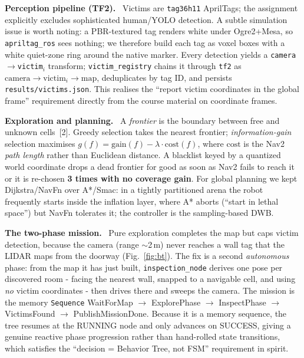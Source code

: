 \documentclass[10pt,twocolumn,a4paper]{article}
\newcommand{\head}[1]{\par\smallskip\noindent\textbf{\color{nccblue}#1}\ \ignorespaces}
\begin{document}
\head{Perception pipeline (TF2).} Victims are \texttt{tag36h11} AprilTags; the assignment explicitly
excludes sophisticated human/YOLO detection. A subtle simulation issue is worth noting: a PBR-textured tag
renders white under Ogre2+Mesa, so \texttt{apriltag\_ros} sees nothing; we therefore build each tag as
voxel boxes with a white quiet-zone ring around the native marker. Every detection yields a
\texttt{camera}$\to$\texttt{victim}$_i$ transform; \texttt{victim\_registry} chains it through
\texttt{tf2} as $\text{camera}\to\text{victim}_i\to\text{map}$, deduplicates by tag ID, and persists
\texttt{results/victims.json}. This realises the ``report victim coordinates in the global frame''
requirement directly from the course material on coordinate frames.

\head{Exploration and planning.} A \emph{frontier} is the boundary between free and unknown
cells~[2]. Greedy selection takes the nearest frontier; \emph{information-gain} selection maximises
$g(f)=\mathrm{gain}(f)-\lambda\cdot\mathrm{cost}(f)$, where $\mathrm{cost}$ is the Nav2 \emph{path length}
rather than Euclidean distance. A blacklist keyed by a quantized world coordinate drops a dead frontier
for good as soon as Nav2 fails to reach it or it is re-chosen \textbf{3 times with no coverage gain}. For
global planning we kept Dijkstra/NavFn over A*/Smac: in a tightly partitioned arena the robot frequently
starts inside the inflation layer, where A* aborts (``start in lethal space'') but NavFn tolerates it; the
controller is the sampling-based DWB.

\head{The two-phase mission.} Pure exploration completes the map but caps victim detection, because the
camera (range $\sim$2\,m) never reaches a wall tag that the LIDAR maps from the doorway
(Fig.~\ref{fig:bt}). The fix is a second \emph{autonomous} phase: from the map it has just built,
\texttt{inspection\_node} derives one pose per discovered room - facing the nearest wall, snapped to a
navigable cell, and using \emph{no} victim coordinates - then drives there and sweeps the camera. The
mission is the memory \texttt{Sequence} \textsf{WaitForMap $\to$ ExplorePhase $\to$ InspectPhase $\to$
VictimsFound $\to$ PublishMissionDone}. Because it is a memory sequence, the tree resumes at the RUNNING
node and only advances on SUCCESS, giving a genuine reactive phase progression rather than hand-rolled
state transitions, which satisfies the ``decision = Behavior Tree, not FSM'' requirement in spirit.
\end{document}
